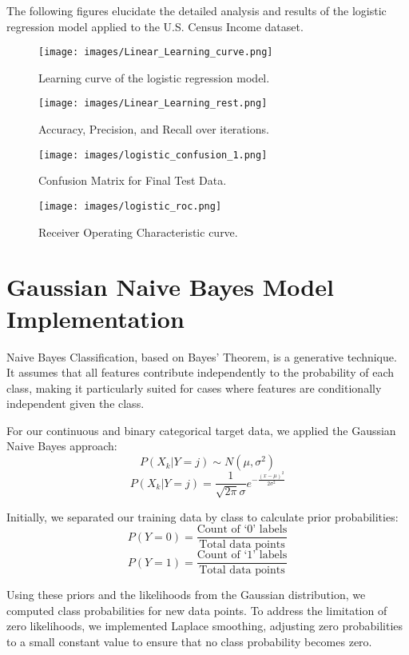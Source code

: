 \documentclass[12pt]{article}
\begin{document}
The following figures elucidate the detailed analysis and results of the logistic regression model applied to the U.S. Census Income dataset.

\begin{figure}[H]
\centering
\texttt{[image: images/Linear\_Learning\_curve.png]}
\caption{Learning curve of the logistic regression model.}
\label{fig:learning_curve}
\end{figure}

\begin{figure}[H]
\centering
\texttt{[image: images/Linear\_Learning\_rest.png]}
\caption{Accuracy, Precision, and Recall over iterations.}
\label{fig:metrics}
\end{figure}

\begin{figure}[H]
\centering
\texttt{[image: images/logistic\_confusion\_1.png]}
\caption{Confusion Matrix for Final Test Data.}
\label{fig:confusion_matrix}
\end{figure}

\begin{figure}[H]
\centering
\texttt{[image: images/logistic\_roc.png]}
\caption{Receiver Operating Characteristic curve.}
\label{fig:roc_curve}
\end{figure}

\newpage
\section{Gaussian Naive Bayes Model Implementation}
Naive Bayes Classification, based on Bayes' Theorem, is a generative technique. It assumes that all features contribute independently to the probability of each class, making it particularly suited for cases where features are conditionally independent given the class.

For our continuous and binary categorical target data, we applied the Gaussian Naive Bayes approach:
\[ P(X_k | Y = j) \sim N(\mu, \sigma^2) \]
\[ P(X_k | Y = j) = \frac{1}{\sqrt{2\pi} \sigma} e^{-\frac{(x-\mu)^2}{2\sigma^2}} \]

Initially, we separated our training data by class to calculate prior probabilities:
\[ P(Y = 0) = \frac{\text{Count of `0' labels}}{\text{Total data points}} \]
\[ P(Y = 1) = \frac{\text{Count of `1' labels}}{\text{Total data points}} \]

Using these priors and the likelihoods from the Gaussian distribution, we computed class probabilities for new data points. To address the limitation of zero likelihoods, we implemented Laplace smoothing, adjusting zero probabilities to a small constant value to ensure that no class probability becomes zero.
\end{document}
